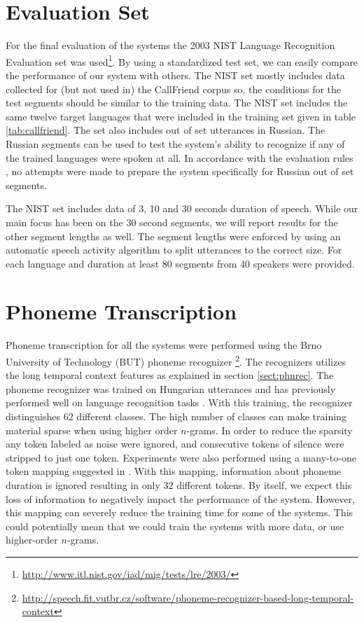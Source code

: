 \section{Evaluation Set}

For the final evaluation of the systems the 2003 NIST Language Recognition Evaluation set was used\footnote{\url{http://www.itl.nist.gov/iad/mig/tests/lre/2003/}}. By using a standardized test set, we can easily compare the performance of our system with others. The NIST set mostly includes data collected for (but not used in) the CallFriend corpus \cite{martin2003nist} so, the conditions for the test segments should be similar to the training data. The NIST set includes the same twelve target languages that were included in the training set given in table \ref{tab:callfriend}. The set also includes out of set utterances in Russian. The Russian segments can be used to test the system's ability to recognize if any of the trained languages were spoken at all. In accordance with the evaluation rules \cite{martin2003nist}, no attempts were made to prepare the system specifically for Russian out of set segments.

The NIST set includes data of 3, 10 and 30 seconds duration of speech. While our main focus has been on the 30 second segments, we will report results for the other segment lengths as well. The segment lengths were enforced by using an automatic speech activity algorithm to split utterances to the correct size. For each language and duration at least 80 segments from 40 speakers were provided. 

\section{Phoneme Transcription}
\label{sect:phonetranscription}

Phoneme transcription for all the systems were performed using the Brno University of Technology (BUT) phoneme recognizer \footnote{\url{http://speech.fit.vutbr.cz/software/phoneme-recognizer-based-long-temporal-context}}. The recognizers utilizes the long temporal context features as explained in section \ref{sect:phnrec}. The phoneme recognizer was trained on Hungarian utterances and has previously performed well on language recognition tasks \cite{lrivector, torres2008mitll}. With this training, the recognizer distinguishes $62$ different classes. The high number of classes can make training material sparse when using higher order $n$-grams. In order to reduce the sparsity any token labeled as noise were ignored, and consecutive tokens of silence were stripped to just one token. Experiments were also performed using a many-to-one token mapping suggested in \cite{torres2008mitll}. With this mapping, information about phoneme duration is ignored resulting in only $32$ different tokens. By itself, we expect this loss of information to negatively impact the performance of the system. However, this mapping can severely reduce the training time for some of the systems. This could potentially mean that we could train the systems with more data, or use higher-order $n$-grams.

